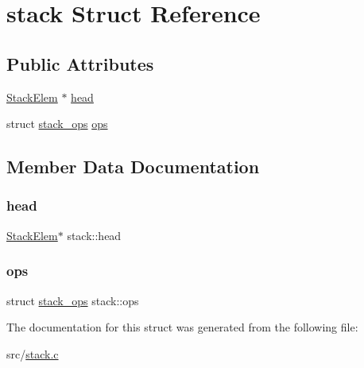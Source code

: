 \hypertarget{structstack}{}\section{stack Struct Reference}
\label{structstack}
\subsection*{Public Attributes}
\begin{DoxyCompactItemize}
\item 
\mbox{\hyperlink{stack_8c_a88b8340a4dfb89fe37115fc2b0719d20}{Stack\+Elem}} $\ast$ \mbox{\hyperlink{structstack_a33c586932dfd5aeb051fe544a0c26f58}{head}}
\item 
struct \mbox{\hyperlink{structstack__ops}{stack\+\_\+ops}} \mbox{\hyperlink{structstack_aafda422820e4433e1b36f211b0710601}{ops}}
\end{DoxyCompactItemize}


\subsection{Member Data Documentation}
\mbox{\label{structstack_a33c586932dfd5aeb051fe544a0c26f58}} 
\subsubsection{\texorpdfstring{head}{head}}
{\footnotesize\ttfamily \mbox{\hyperlink{stack_8c_a88b8340a4dfb89fe37115fc2b0719d20}{Stack\+Elem}}$\ast$ stack\+::head}

\mbox{\label{structstack_aafda422820e4433e1b36f211b0710601}} 
\subsubsection{\texorpdfstring{ops}{ops}}
{\footnotesize\ttfamily struct \mbox{\hyperlink{structstack__ops}{stack\+\_\+ops}} stack\+::ops}



The documentation for this struct was generated from the following file\+:\begin{DoxyCompactItemize}
\item 
src/\mbox{\hyperlink{stack_8c}{stack.\+c}}\end{DoxyCompactItemize}
